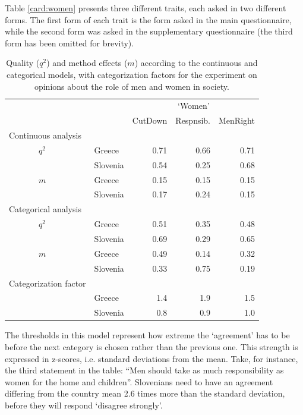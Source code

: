 \documentclass[a4paper,12pt]{article}
\begin{document}
Table \ref{card:women} presents three different traits, each asked in two different forms. The first form of each trait is the form asked in the main questionnaire, while the second form was asked in the supplementary questionnaire (the third form has been omitted for brevity). 

\begin{table}\centering\begin{footnotesize}\caption{Quality ($q^2$) and method effects ($m$) according to the continuous and categorical models, with categorization factors for the experiment on opinions about the role of men and women in society.\label{tab:women}}\begin{tabular}{lllrrr}
\hline
 &  &  & \multicolumn{3}{c}{`Women'} \\
 &  &  & CutDown & Respnsib. & MenRight\\
\hline
\multicolumn{2}{l}{Continuous analysis}\\		   
 & $q^2$ & Greece & 0.71 & 0.66 & 0.71\\
 &  & Slovenia & 0.54 & 0.25 & 0.68\\
& $m$ & Greece & 0.15 & 0.15 & 0.15\\
&  & Slovenia & 0.17 & 0.24 & 0.15\\
\multicolumn{2}{l}{Categorical analysis}   &  &  &  & \\
 & $q^2$ & Greece & 0.51 & 0.35 & 0.48\\
 &  & Slovenia & 0.69 & 0.29 & 0.65\\
& $m$ & Greece & 0.49 & 0.14 & 0.32\\
&  & Slovenia & 0.33 & 0.75 & 0.19\\
 \multicolumn{2}{l}{Categorization factor}   &  &  &  & \\
 &  & Greece & 1.4 & 1.9 & 1.5\\
 &  & Slovenia & 0.8 & 0.9 & 1.0\\
\hline
\end{tabular}\end{footnotesize}\end{table}

The thresholds in this model represent how extreme the `agreement' has to be before the next category is chosen rather than the previous one. This strength is expressed in z-scores, i.e. standard deviations from the mean. Take, for instance, the third statement in the table: ``Men should take as much responsibility as women for the home and children''.  Slovenians need to have an agreement differing from the country mean 2.6 times more than the standard deviation, before they will respond `disagree strongly'. 
\end{document}
